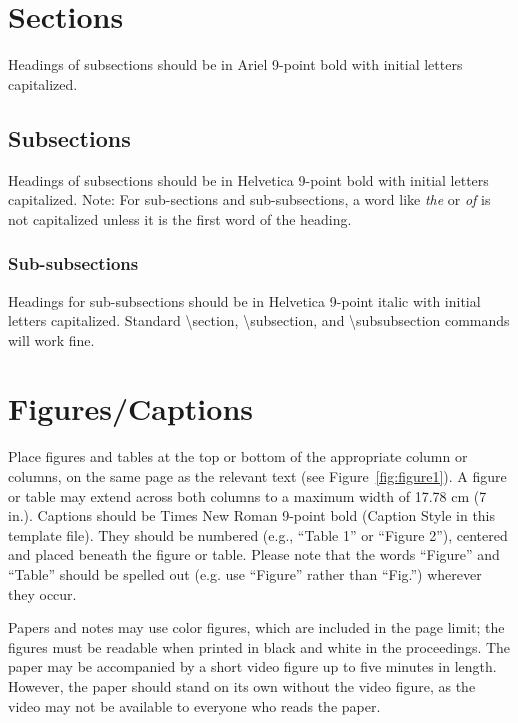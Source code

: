 \documentclass{scsPaperFormattingTemplate-LaTex-Revised20160302}
\begin{document}
\section{Sections}

Headings of subsections should be in Ariel 9-point bold with initial letters capitalized.

\subsection{Subsections}

Headings of subsections should be in Helvetica 9-point bold with
initial letters capitalized. Note: For sub-sections and sub-subsections, a word like \emph{the} or \emph{of} is not capitalized unless it is the first word of the heading.

\subsubsection{Sub-subsections}

Headings for sub-subsections should be in Helvetica 9-point italic
with initial letters capitalized.  Standard {\textbackslash}section,
{\textbackslash}subsection, and {\textbackslash}subsubsection commands
will work fine.

\section{Figures/Captions}

Place figures and tables at the top or bottom of the appropriate column or columns, on the same page as the relevant text (see Figure~\ref{fig:figure1}). 
A figure or table may extend across both columns to a maximum width of 17.78 cm (7 in.). Captions should be Times New Roman 9-point bold (Caption Style in this template file). They should be numbered (e.g., “Table 1” or “Figure 2”), centered and placed beneath the figure or table. Please note that the words “Figure” and “Table” should be spelled out (e.g. use “Figure” rather than “Fig.”) wherever they occur. 

Papers and notes may use color figures, which are included in the page limit; the figures must be readable when printed in black and white in the proceedings.
The paper may be accompanied by a short video figure up to five minutes in length. However, the paper should stand on its own without the video figure, as the video may not be available to everyone who reads the paper.
\end{document}
